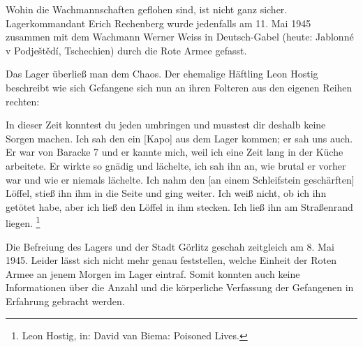 \newpage
Wohin die Wachmannschaften geflohen sind, ist nicht ganz sicher. Lagerkommandant Erich Rechenberg wurde jedenfalls am 11. Mai 1945 zusammen mit dem Wachmann Werner Weiss in Deutsch-Gabel (heute: Jablonné v Podještědí, Tschechien) durch die Rote Armee gefasst.\newline

Das Lager überließ man dem Chaos. Der ehemalige Häftling Leon Hostig beschreibt wie sich Gefangene sich nun an ihren Folteren aus den eigenen Reihen rechten:
\begin{leftbar} 
In dieser Zeit konntest du jeden umbringen und musstest dir deshalb keine Sorgen machen. Ich sah den ein [Kapo] aus dem Lager kommen; er sah uns auch. Er war von Baracke 7 und er kannte mich, weil ich eine Zeit lang in der Küche arbeitete. Er wirkte so gnädig und lächelte, ich sah ihn an, wie brutal er vorher war und wie er niemals lächelte. Ich nahm den [an einem Schleifstein geschärften] Löffel, stieß ihn ihm in die Seite und ging weiter. Ich weiß nicht, ob ich ihn getötet habe, aber ich ließ den Löffel in ihm stecken. Ich ließ ihn am Straßenrand liegen. 
\footnote{Leon Hostig, in: David van Biema: Poisoned Lives.}
\end{leftbar} 

Die Befreiung des Lagers und der Stadt Görlitz geschah zeitgleich am 8. Mai 1945. Leider lässt sich nicht mehr genau feststellen, welche Einheit der Roten Armee an jenem Morgen im Lager eintraf. Somit konnten auch keine Informationen über die Anzahl und die körperliche Verfassung der Gefangenen in Erfahrung gebracht werden.\newline

